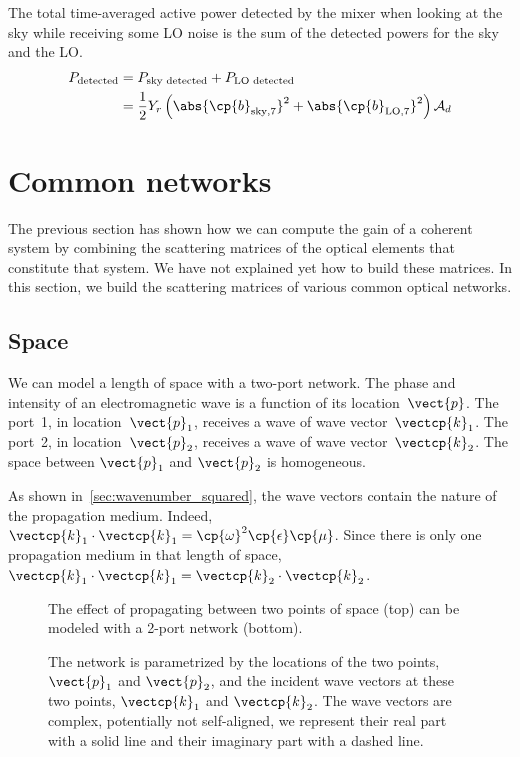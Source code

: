 The total time-averaged active power detected by the mixer when looking at the sky while receiving some LO noise is the sum of the detected powers for the sky and the LO.
\begin{align*}
    P_\text{detected}
    &=
    P_\text{sky detected} + P_\text{LO detected}
    \\
    &= \frac{1}{2}
       Y_r
       \left(
           \abs{\cp{b}_{\text{sky},7}}^2
           +
           \abs{\cp{b}_{\text{LO},7}}^2
       \right)
       \mathcal{A}_d
\end{align*}



\FloatBarrier
\section{Common networks}
The previous section has shown how we can compute the gain of a coherent system by combining the scattering matrices of the optical elements that constitute that system.
We have not explained yet how to build these matrices.
In this section, we build the scattering matrices of various common optical networks.



\subsection{Space}
We can model a length of space with a two-port network.
The phase and intensity of an electromagnetic wave is a function of its location~$\vect{p}$.
The port~1, in location~$\vect{p}_1$, receives a wave of wave vector~$\vectcp{k}_1$.
The port~2, in location~$\vect{p}_2$, receives a wave of wave vector~$\vectcp{k}_2$.
The space between $\vect{p}_1$ and $\vect{p}_2$ is homogeneous.

As shown in~\cref{sec:wavenumber_squared}, the wave vectors contain the nature of the propagation medium.
Indeed, $\vectcp{k}_1\cdot\vectcp{k}_1 = \cp{\omega}^2\cp{\epsilon}\cp{\mu}$.
Since there is only one propagation medium in that length of space,
$\vectcp{k}_1\cdot\vectcp{k}_1 = \vectcp{k}_2\cdot\vectcp{k}_2$.

\begin{figure}[hbtp]
    \centering
    
    \caption{The effect of propagating between two points of space (top) can be modeled with a 2-port network (bottom).}
    \caption*{
        The network is parametrized by the locations of the two points,
        $\vect{p}_1$ and $\vect{p}_2$,
        and the incident wave vectors at these two points,
        $\vectcp{k}_1$ and $\vectcp{k}_2$.
        The wave vectors are complex, potentially not self-aligned, we represent their real part with a solid line and their imaginary part with a dashed line.
    }
    \label{fig:network_distance}
\end{figure}

